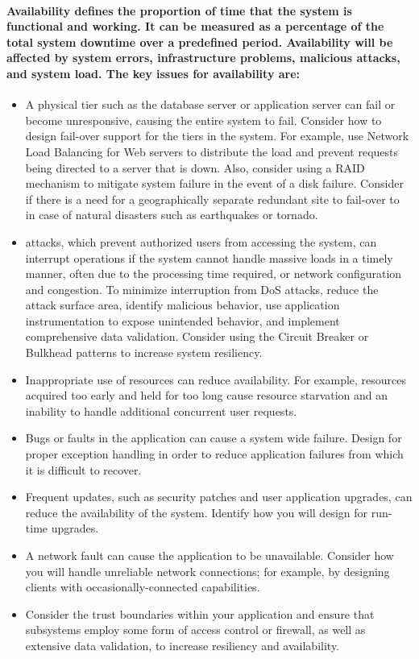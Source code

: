 \documentclass[../Psychological_system_web_application.tex]{subfiles}
\begin{document}
				\paragraph{\gls{Availability} defines the proportion of time that the system is functional and working. It can be measured as a percentage of the total system downtime over a predefined period. Availability will be affected by system errors, infrastructure problems, malicious attacks, and system load. The key issues for availability are:}
				\begin{itemize}
					\item
						A physical tier such as the database server or application server can fail or become unresponsive, causing the entire system to fail. Consider how to design fail-over support for the tiers in the system. For example, use Network Load Balancing for Web servers to distribute the load and prevent requests being directed to a server that is down. Also, consider using a RAID mechanism to mitigate system failure in the event of a disk failure. Consider if there is a need for a geographically separate redundant site to fail-over to in case of natural disasters such as earthquakes or tornado.
					\item
						 attacks, which prevent authorized users from accessing the system, can interrupt operations if the system cannot handle massive loads in a timely manner, often due to the processing time required, or network configuration and congestion. To minimize interruption from DoS attacks, reduce the attack surface area, identify malicious behavior, use application instrumentation to expose unintended behavior, and implement comprehensive data validation. Consider using the Circuit Breaker or Bulkhead patterns to increase system resiliency.
					\item
						Inappropriate use of resources can reduce availability. For example, resources acquired too early and held for too long cause resource starvation and an inability to handle additional concurrent user requests.
					\item
						Bugs or faults in the application can cause a system wide failure. Design for proper exception handling in order to reduce application failures from which it is difficult to recover.
					\item
						Frequent updates, such as security patches and user application upgrades, can reduce the availability of the system. Identify how you will design for run-time upgrades.
					\item
						A network fault can cause the application to be unavailable. Consider how you will handle unreliable network connections; for example, by designing clients with occasionally-connected capabilities.
					\item
						Consider the trust boundaries within your application and ensure that subsystems employ some form of access control or firewall, as well as extensive data validation, to increase resiliency and availability.
				\end{itemize}
			
\end{document}
